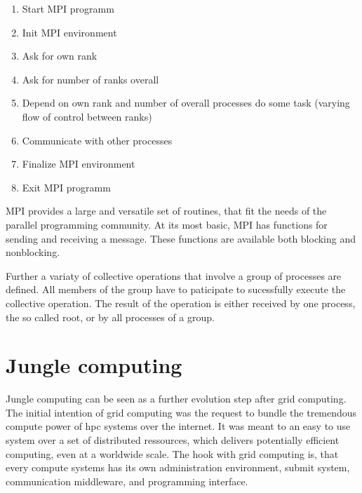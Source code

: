 \begin{enumerate}
\item Start MPI programm
\item Init MPI environment
\item Ask for own rank
\item Ask for number of ranks overall
\item Depend on own rank and number of overall processes do some task
  (varying flow of control between ranks)
\item Communicate with other processes
\item Finalize MPI environment
\item Exit MPI programm
\end{enumerate}

MPI provides a large and versatile set of routines, that fit the needs
of the parallel programming community. At its most basic, MPI has
functions for sending and receiving a message.  These functions are
available both blocking and nonblocking.

Further a variaty of collective operations that involve a group of
processes are defined. All members of the group have to paticipate to
sucessfully execute the collective operation.  The result of the
operation is either received by one process, the so called root, or by
all processes of a group.



\section{Jungle computing}

Jungle computing can be seen as a further evolution step after
grid computing. The initial intention of grid computing was
the request to bundle the tremendous compute power of hpc
systems over the internet\cite{ref:grid}. It was meant to an
easy to use system over a set of distributed ressources, which
delivers potentially efficient computing, even at a worldwide scale.
The hook with grid computing is, that every compute systems has its
own administration environment, submit system, communication middleware,
and programming interface. 

